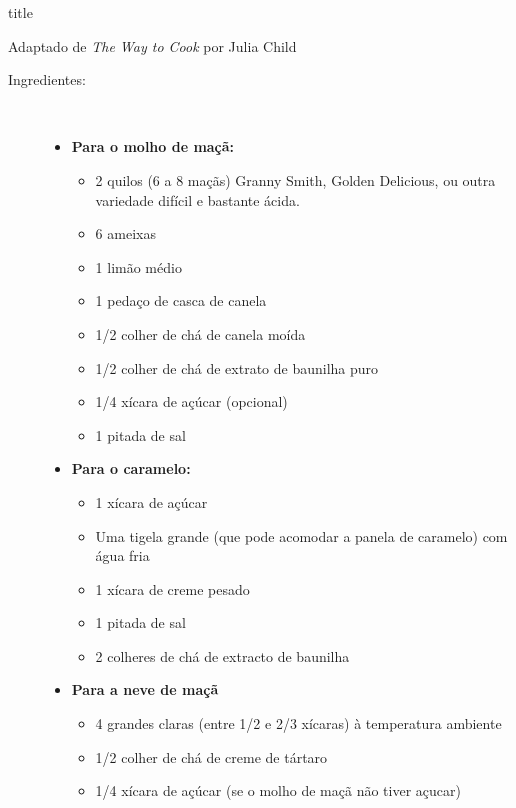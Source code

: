 \documentclass [11pt, letterpaper] {article}
\begin{document}
 {title}

\begin {flushright}
{Adaptado de {\it The Way to Cook} por Julia Child}
\end {flushright}


\vspace {0.3in}
\begin {description}

\item [Ingredientes:] \ \\
\begin {itemize}
\item {\bf Para o molho de maçã:}
	\begin {itemize}
	\item 2 quilos (6 a 8 maçãs) Granny Smith, Golden Delicious, ou outra variedade difícil e bastante ácida.
	\item 6 ameixas
	\item 1 limão médio
	\item 1 peda\c{c}o de casca de canela
	\item 1/2 colher de chá de canela moída
	\item 1/2 colher de chá de extrato de baunilha puro
	\item 1/4 xícara de açúcar (opcional)
	\item 1 pitada de sal
	\end {itemize}
\item {\bf Para o caramelo:}
	\begin {itemize}
	\item 1 xícara de açúcar
	\item Uma tigela grande (que pode acomodar a panela de caramelo) com água fria
	\item 1 xícara de creme pesado
	\item 1 pitada de sal
	\item 2 colheres de chá de extracto de baunilha
	\end {itemize}
\item {\bf Para a neve de ma\c{c}\~a}
	\begin {itemize}
	\item 4 grandes claras (entre 1/2 e 2/3 xícaras) à temperatura ambiente
	\item 1/2 colher de chá de creme de tártaro
	\item 1/4 xícara de açúcar (se o molho de maçã não tiver a\c{c}ucar)
	\end {itemize}
\end{itemize}


\end{description}
\end{document}
